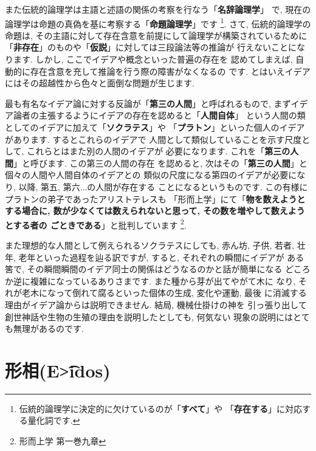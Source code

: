 また伝統的論理学は主語と述語の関係の考察を行なう「\textbf{名辞論理学}」
で, 現在の論理学は命題の真偽を基に考察する「\textbf{命題論理学}」です
\footnote{伝統的論理学に決定的に欠けているのが「\textbf{すべて}」や
「\textbf{存在する}」に対応する量化詞です.}. さて, 伝統的論理学の命題は,
 その主語に対して存在含意を前提にして論理学が構築されているために
「\textbf{非存在}」のものや「\textbf{仮説}」に対しては三段論法等の推論が
行えないことになります. しかし, ここでイデアや概念といった普遍の存在を
認めてしまえば, 自動的に存在含意を充して推論を行う際の障害がなくなるの
です. とはいえイデアにはその超越性から色々と面倒な問題が生じます.
\newline

最も有名なイデア論に対する反論が「\textbf{第三の人間}」と呼ばれるもので,
 まずイデア論者の主張するようにイデアの存在を認めると「\textbf{人間自体}」
という人間の類としてのイデアに加えて「\textbf{ソクラテス}」や
「\textbf{プラトン}」といった個人のイデアがあります. するとこれらのイデアで
人間として類似していることを示す尺度として, これらとはまた別の人間のイデアが
必要になります. これを「\textbf{第三の人間}」と呼びます. この第三の人間の存在
を認めると, 次はその「\textbf{第三の人間}」と個々の人間や人間自体のイデアとの
類似の尺度になる第四のイデアが必要になり, 以降, 第五, 第六...の人間が存在する
ことになるというものです.  この有様にプラトンの弟子であったアリストテレスも
「形而上学」\cite{アリストテレス2}にて「\textbf{物を数えようとする場合に,
 数が少なくては数えられないと思って, その数を増やして数えようとする者の
ごときである}」と批判しています\cite{アリストテレス2}
\footnote{形而上学 第一巻九章}.
\newline


また理想的な人間として例えられるソクラテスにしても, 赤ん坊, 子供, 若者,
 壮年, 老年といった過程を辿る訳ですが, すると, それぞれの瞬間にイデアが
ある筈で, その瞬間瞬間のイデア同士の関係はどうなるのかと話が簡単になる
どころか逆に複雑になっているありさまです. また種から芽が出てやがて木に
なり, それが老木になって倒れて腐るといった個体の生成, 変化や運動, 最後
に消滅する理由がイデア論からは説明できません. 結局, 機械仕掛けの神を
引っ張り出して創世神話や生物の生殖の理由を説明したとしても, 何気ない
現象の説明にはとても無理があるのです.


\section{形相(\textgreek{E\t{>i}dos})}

